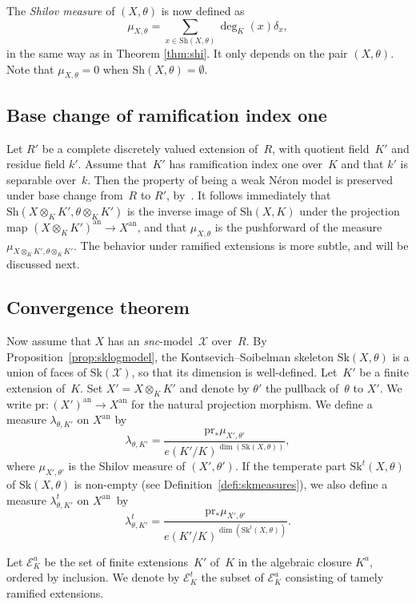 \documentclass[JEP,XML,SOM,Unicode,NoFloatCountersInSection]{cedram}
\let\mathcal\mathscr
\theoremstyle{definition}
\numberwithin{equation}{subsection}
\newcommand{\cX}{\ensuremath{\mathscr{X}}}
\newcommand{\snc}{\textit{snc}}
\newcommand{\an}{\mathrm{an}}
\newcommand{\pr}{\mathrm{pr}}
\newcommand{\Sh}{\mathrm{Sh}}
\newcommand{\Sk}{\mathrm{Sk}}
\let\form\theta
\begin{document}
The \emph{Shilov measure} of $(X,\form)$ is now defined as
\begin{equation*}
\mu_{X,\form}=\sum_{x\in \Sh(X,\form)}\deg_K(x) \delta_x,
\end{equation*}
in the same way as in Theorem \ref{thm:shi}.
It only depends on the pair $(X,\form)$.
Note that $\mu_{X,\form}=0$ when $\Sh(X,\form)=\emptyset$.

\subsection{Base change of ramification index one}
Let $R'$ be a complete discretely valued extension of~$R$, with quotient field~$K'$ and residue field $k'$. Assume that~$K'$ has ramification index one over~$K$ and that $k'$ is separable over~$k$. Then the property of being a weak Néron model is preserved under base change from~$R$ to $R'$, by~\cite[3.6/7]{BLR}.
It follows immediately that $\Sh(X\otimes_K K',\form\otimes_K K')$ is the inverse image of $\Sh(X,K)$ under the projection map
$(X\otimes_K K')^{\an}\to X^{\an}$, and that $\mu_{X,\form}$ is the pushforward of the measure $\mu_{X\otimes_K K',\form\otimes_K K'}$.
The behavior under ramified extensions is more subtle, and will be discussed next.

\subsection{Convergence theorem}
Now assume that $X$ has an \snc-model~$\cX$ over~$R$.
By Proposition~\ref{prop:sklogmodel}, the Kontsevich--Soibelman skeleton $\Sk(X,\form)$ is a union of faces of $\Sk(\cX)$, so that its dimension is well-defined.
Let~$K'$ be a finite extension of~$K$. Set $X'=X\otimes_K K'$ and denote by $\form'$ the pullback of~$\form$ to $X'$. We write $\pr\colon (X')^{\an}\to X^{\an}$ for the natural projection morphism. We define a measure $\lambda_{\form,K'}$ on $X^{\an}$ by
\[
\lambda_{\form,K'}=\frac{\pr_\ast\mu_{X',\form'}}{e(K'/K)^{\dim(\Sk(X,\form))}},
\]
where $\mu_{X',\form'}$ is the Shilov measure of $(X',\form')$.
If the temperate part $\Sk^t(X,\form)$ of $\Sk(X,\form)$ is non-empty (see Definition~\ref{defi:skmeasures}), we also define a measure $\lambda^t_{\form,K'}$ on $X^{\an}$~by
\[
\lambda^t_{\form,K'}=\frac{\pr_\ast\mu_{X',\form'}}{e(K'/K)^{\dim(\Sk^t(X,\form))}}.
\]

Let $\mathcal{E}^a_K$ be the set of finite extensions~$K'$ of~$K$ in the algebraic closure $K^a$, ordered by inclusion. We denote by
$\mathcal{E}^t_K$ the subset of $\mathcal{E}^a_K$ consisting of tamely ramified extensions.
\end{document}
